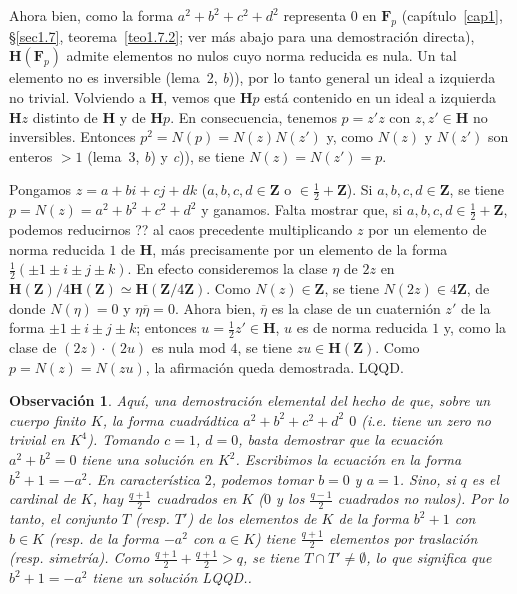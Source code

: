 \documentclass[bibtotoc,leqno,spanish]{amsbook}
\let\emph\relax %
\newcommand{\ZZ}{\mathbf{Z}}
\newcommand{\FF}{\mathbf{F}}
\newcommand{\HH}{\mathbf{H}}
\newcommand{\QED}{LQQD.}
\newcommand{\oline}[1]{\overline{#1}}
\numberwithin{equation}{section}
\theoremstyle{note}
\theoremstyle{note}
\theoremstyle{rem}
\newtheorem*{remark*}{Observaci\'on}
\numberwithin{theorem}{section}
\numberwithin{proposition}{section}
\numberwithin{definition}{section}
\numberwithin{lemma}{section}
\numberwithin{corollary}{section}
\numberwithin{example}{section}
\numberwithin{footnote}{section}%
\begin{document}
Ahora bien, como la forma $a^{2}+b^{2}+c^{2}+d^{2}$ representa $0$ en $\FF_{p}$ (cap\'itulo~\ref{cap1},
\S\ref{sec1.7}, teorema~\ref{teo1.7.2};
ver m\'as abajo para una demostraci\'on directa), $\HH(\FF_{p})$ admite elementos
no nulos cuyo norma reducida es nula. Un tal elemento no es inversible (lema~2, {\itshape b})), por lo
tanto general un ideal a izquierda no trivial. Volviendo a $\HH$, vemos que $\HH p$ est\'a
contenido en un ideal a izquierda $\HH z$ distinto de $\HH$ y de $\HH p$. En consecuencia, tenemos
$p = z'z$ con $z,z'\in\HH$ no inversibles. Entonces $p^{2}=N(p)=N(z)N(z')$ y, como
$N(z)$ y $N(z')$ son enteros $>1$ (lema~3, {\itshape b}) y {\itshape c})), se tiene $N(z) = N(z') = p$.

Pongamos $z = a+bi+cj+dk$ ($a,b,c,d\in\ZZ$ o $\in\frac{1}{2}+\ZZ$). Si $a,b,c,d\in\ZZ$, se tiene
$p = N(z) = a^{2}+b^{2}+c^{2}+d^{2}$ y ganamos. Falta mostrar que, si $a,b,c,d\in\frac{1}{2}+\ZZ$, podemos
reducirnos ?? al caos precedente multiplicando $z$ por un elemento de norma reducida $1$ de $\HH$, m\'as
precisamente por un elemento de la forma $\frac{1}{2}(\pm 1\pm i\pm j\pm k)$. En efecto consideremos
la clase $\eta$ de $2z$ en $\HH(\ZZ)/4\HH(\ZZ)\simeq\HH(\ZZ/4\ZZ)$. Como $N(z)\in\ZZ$, se tiene
$N(2z)\in 4\ZZ$, de donde $N(\eta) = 0$ y $\eta\oline\eta = 0$. Ahora bien, $\oline\eta$ es la clase
de un cuaterni\'on $z'$ de la forma $\pm 1\pm i\pm j\pm k$; entonces $u = \frac{1}{2}z'\in\HH$,
$u$ es de norma reducida $1$ y, como la clase de $(2z)\cdot(2u)$ es nula mod $4$, se tiene $zu\in\HH(\ZZ)$.
Como $p=N(z)=N(zu)$, la afirmaci\'on queda demostrada. \QED

\begin{remark*}
Aqu\'i, una demostraci\'on elemental del hecho de que, sobre un cuerpo finito $K$, la forma cuadr\'adtica
$a^{2}+b^{2}+c^{2}+d^{2}$ \emph{representa} $0$ (i.e. tiene un zero no trivial en $K^{4}$). Tomando
$c=1$, $d=0$, basta demostrar que la ecuaci\'on $a^{2}+b^{2}=0$ tiene una soluci\'on en $K^{2}$. Escribimos
la ecuaci\'on en la forma $b^{2}+1=-a^{2}$. En caracter\'istica $2$, podemos tomar $b=0$ y $a=1$.
Sino, si $q$ es el cardinal de $K$, hay $\frac{q+1}{2}$ cuadrados en $K$
($0$ y los $\frac{q-1}{2}$ cuadrados no nulos). Por lo tanto, el conjunto $T$ (resp. $T'$) de los elementos
de $K$ de la forma $b^{2}+1$ con $b\in K$ (resp. de la forma $-a^{2}$ con $a\in K$) tiene
$\frac{q+1}{2}$ elementos por traslaci\'on (resp. simetr\'ia). Como $\frac{q+1}{2}+\frac{q+1}{2}>q$,
se tiene $T\cap T'\neq\emptyset$, lo que significa que $b^{2}+1=-a^{2}$ tiene un soluci\'on \QED.
\end{remark*}
\end{document}
